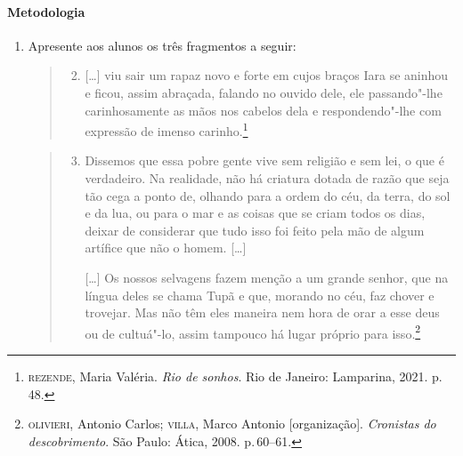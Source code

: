\documentclass[12pt]{extarticle}
\begin{document}
\paragraph{Metodologia}
\begin{enumerate}
\item Apresente aos alunos os três fragmentos a seguir:


\begin{quote}
\begin{enumerate}
\setcounter{enumii}{1}
\item{[\ldots{}]} viu sair um rapaz novo e forte em cujos braços Iara
se aninhou e ficou, assim abraçada, falando no ouvido dele, ele
passando"-lhe carinhosamente as mãos nos cabelos dela e
respondendo"-lhe com expressão de imenso carinho.\footnote{\textsc{rezende}, Maria Valéria. \emph{Rio de sonhos}. Rio de Janeiro: Lamparina, 2021. p.\,48.}
\end{enumerate}
\end{quote}

\begin{quote}
\begin{enumerate}
\setcounter{enumii}{2}
\item Dissemos que essa pobre gente vive sem religião e sem lei, o que é
verdadeiro. Na realidade, não há criatura dotada de razão que seja
tão cega a ponto de, olhando para a ordem do céu, da terra, do sol e
da lua, ou para o mar e as coisas que se criam todos os dias, deixar
de considerar que tudo isso foi feito pela mão de algum artífice que
não o homem. {[\ldots{}]}


{[\ldots{}]} Os nossos selvagens fazem menção a um grande senhor,
que na língua deles se chama Tupã e que, morando no céu, faz chover
e trovejar. Mas não têm eles maneira nem hora de orar a esse deus ou
de cultuá"-lo, assim tampouco há lugar próprio para isso.\footnote{\textsc{olivieri}, Antonio Carlos; \textsc{villa}, Marco Antonio [organização]. \emph{Cronistas do descobrimento}. São Paulo: Ática, 2008. p.\,60--61.}
\end{enumerate}
\end{quote}



\end{enumerate}
\end{document}
